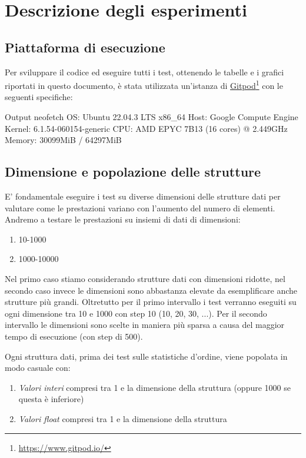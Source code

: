 \documentclass[onecolumn]{article}
\newcommand\anchor[2]{%
  \href{#2}{#1}\footnote{\url{#2}}%
}
\begin{document}
\section{Descrizione degli esperimenti}
\subsection{Piattaforma di esecuzione}

Per sviluppare il codice ed eseguire tutti i test, ottenendo le tabelle e i grafici riportati in questo documento, è stata utilizzata un'istanza di \anchor{Gitpod}{https://www.gitpod.io/} con le seguenti specifiche:
\begin{bashCode}{Output neofetch}
	OS: Ubuntu 22.04.3 LTS x86_64 
	Host: Google Compute Engine 
	Kernel: 6.1.54-060154-generic 
	CPU: AMD EPYC 7B13 (16 cores) @ 2.449GHz 
	Memory: 30099MiB / 64297MiB
\end{bashCode}

\subsection{Dimensione e popolazione delle strutture}

E' fondamentale eseguire i test su diverse dimensioni delle strutture dati per valutare come le prestazioni variano con l'aumento del numero di elementi. Andremo a testare le prestazioni su insiemi di dati di dimensioni:
\begin{enumerate}
	\setlength\itemsep{-0.25em}
	\item 10-1000
	\item 1000-10000
\end{enumerate}

Nel primo caso stiamo considerando strutture dati con dimensioni ridotte, nel secondo caso invece le dimensioni sono abbastanza elevate da esemplificare anche strutture più grandi. Oltretutto per il primo intervallo i test verranno eseguiti su ogni dimensione tra 10 e 1000 con step 10 (10, 20, 30, ...). Per il secondo intervallo le dimensioni sono scelte in maniera più sparsa a causa del maggior tempo di esecuzione (con step di 500). \vspace{1em}

Ogni struttura dati, prima dei test sulle statistiche d'ordine, viene popolata in modo casuale con:
\begin{enumerate}
	\setlength\itemsep{-0.25em}
	\item \textit{Valori interi} compresi tra 1 e la dimensione della struttura (oppure 1000 se questa è inferiore)
	\item \textit{Valori float} compresi tra 1 e la dimensione della struttura
\end{enumerate}
\end{document}
